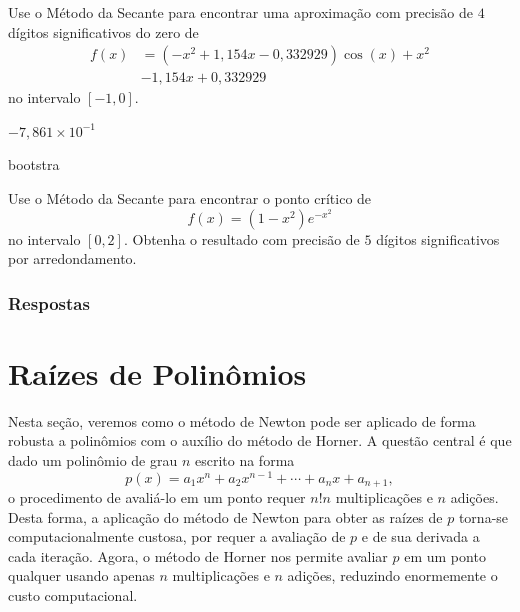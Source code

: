 \begin{exer}
  Use o Método da Secante para encontrar uma aproximação com precisão de $4$ dígitos significativos do zero de 
  \begin{equation}
    \begin{aligned}
      f(x) &= (-x^2+1,154x-0,332929)\cos(x) + x^2 \\
      &- 1,154x + 0,332929
  \end{aligned}
  \end{equation}
  no intervalo $[-1, 0]$.
\end{exer}
\begin{resp}
  $-7,861\times 10^{-1}$
\end{resp}
bootstra
\begin{exer}
  Use o Método da Secante para encontrar o ponto crítico de
  \begin{equation}
    f(x) = (1-x^2)e^{-x^2}
  \end{equation}
  no intervalo $[0, 2]$. Obtenha o resultado com precisão de $5$ dígitos significativos por arredondamento.
\end{exer}

\ifisbook
\subsubsection{Respostas}
\shipoutAnswer
\fi


\section{Raízes de Polinômios}\label{cap_eq1d_sec_raizes}
\badgeRevisar

Nesta seção, veremos como o método de Newton pode ser aplicado de forma robusta a polinômios com o auxílio do método de Horner. A questão central é que dado um polinômio de grau $n$ escrito na forma
\begin{equation}
  p(x) = a_{1}x^n + a_{2}x^{n-1} + \cdots + a_nx + a_{n+1},
\end{equation}
o procedimento de avaliá-lo em um ponto requer $n!n$ multiplicações e $n$ adições. Desta forma, a aplicação do método de Newton para obter as raízes de $p$ torna-se computacionalmente custosa, por requer a avaliação de $p$ e de sua derivada a cada iteração. Agora, o método de Horner nos permite avaliar $p$ em um ponto qualquer usando apenas $n$ multiplicações e $n$ adições, reduzindo enormemente o custo computacional.

